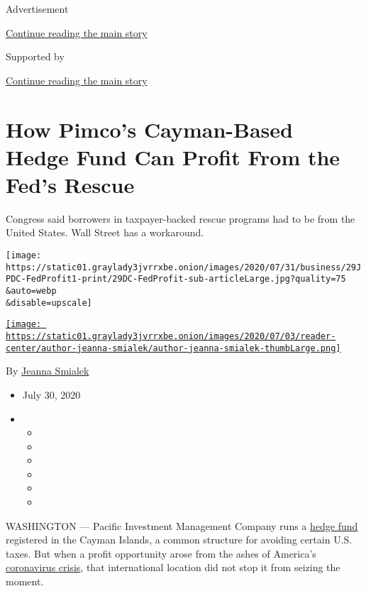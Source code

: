 Advertisement

\protect\hyperlink{after-top}{Continue reading the main story}

Supported by

\protect\hyperlink{after-sponsor}{Continue reading the main story}

\hypertarget{how-pimcos-cayman-based-hedge-fund-can-profit-from-the-feds-rescue}{%
\section{How Pimco's Cayman-Based Hedge Fund Can Profit From the Fed's
Rescue}\label{how-pimcos-cayman-based-hedge-fund-can-profit-from-the-feds-rescue}}

Congress said borrowers in taxpayer-backed rescue programs had to be
from the United States. Wall Street has a workaround.

\texttt{[image: https://static01.graylady3jvrrxbe.onion/images/2020/07/31/business/29JPDC-FedProfit1-print/29DC-FedProfit-sub-articleLarge.jpg?quality=75\\\&auto=webp\\\&disable=upscale]}

\href{https://www.nytimes3xbfgragh.onion/by/jeanna-smialek}{\texttt{[image: https://static01.graylady3jvrrxbe.onion/images/2020/07/03/reader-center/author-jeanna-smialek/author-jeanna-smialek-thumbLarge.png]}}

By \href{https://www.nytimes3xbfgragh.onion/by/jeanna-smialek}{Jeanna
Smialek}

\begin{itemize}
\item
  July 30, 2020
\item
  \begin{itemize}
  \item
  \item
  \item
  \item
  \item
  \item
  \end{itemize}
\end{itemize}

WASHINGTON --- Pacific Investment Management Company runs a
\href{https://sec.report/Document/0001569540-16-000003/}{hedge fund}
registered in the Cayman Islands, a common structure for avoiding
certain U.S. taxes. But when a profit opportunity arose from the ashes
of America's
\href{https://www.nytimes3xbfgragh.onion/news-event/coronavirus}{coronavirus
crisis}, that international location did not stop it from seizing the
moment.

